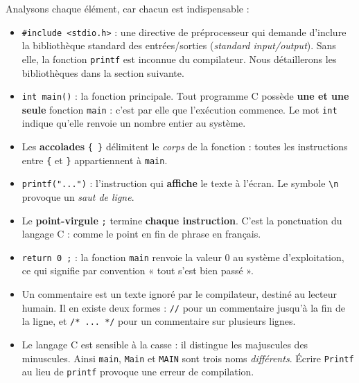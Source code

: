 \documentclass[11pt]{article}
\newcommand{\cle}[1]{{\popxbold\color{popdark}#1}}
\begin{document}
Analysons chaque élément, car chacun est indispensable :

\begin{itemize}
\item \texttt{\#include <stdio.h>} : une \cle{directive de préprocesseur} qui demande d'inclure la \cle{bibliothèque} standard des entrées/sorties (\emph{standard input/output}). Sans elle, la fonction \texttt{printf} est inconnue du compilateur. Nous détaillerons les bibliothèques dans la section suivante.
\item \texttt{int main()} : la \cle{fonction principale}. Tout programme C possède \textbf{une et une seule} fonction \texttt{main} : c'est par elle que l'exécution commence. Le mot \texttt{int} indique qu'elle renvoie un nombre entier au système.
\item Les \textbf{accolades} \texttt{\{ \}} délimitent le \emph{corps} de la fonction : toutes les instructions entre \texttt{\{} et \texttt{\}} appartiennent à \texttt{main}.
\item \texttt{printf("...")} : l'instruction qui \textbf{affiche} le texte à l'écran. Le symbole \texttt{\textbackslash n} provoque un \emph{saut de ligne}.
\item Le \textbf{point-virgule} \texttt{;} termine \textbf{chaque instruction}. C'est la ponctuation du langage C : comme le point en fin de phrase en français.
\item \texttt{return 0 ;} : la fonction \texttt{main} renvoie la valeur $0$ au système d'exploitation, ce qui signifie par convention « tout s'est bien passé ».
\end{itemize}

\begin{propriete}
\begin{itemize}
\item Un \cle{commentaire} est un texte ignoré par le compilateur, destiné au lecteur humain. Il en existe deux formes : \texttt{//} pour un commentaire jusqu'à la fin de la ligne, et \texttt{/* ... */} pour un commentaire sur plusieurs lignes.
\item Le langage C est \cle{sensible à la casse} : il distingue les majuscules des minuscules. Ainsi \texttt{main}, \texttt{Main} et \texttt{MAIN} sont trois noms \emph{différents}. Écrire \texttt{Printf} au lieu de \texttt{printf} provoque une erreur de compilation.
\end{itemize}
\end{propriete}
\end{document}
